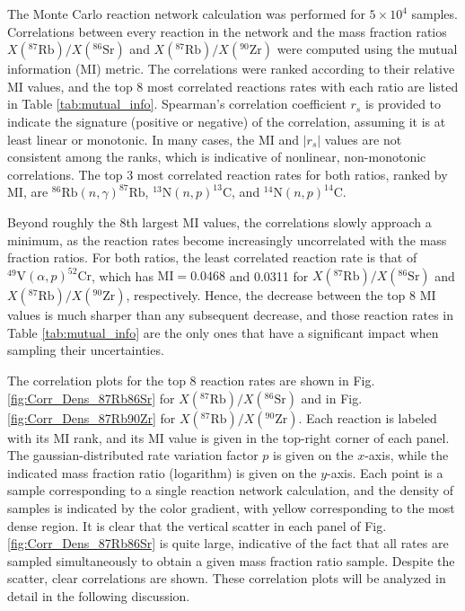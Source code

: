 The Monte Carlo reaction network calculation was performed for $5 \times 10^{4}$ samples. Correlations between every reaction in the network and the mass fraction ratios $X(^{87}\mathrm{Rb})/X(^{86}\mathrm{Sr})$ and $X(^{87}\mathrm{Rb})/X(^{90}\mathrm{Zr})$ were computed using the mutual information (MI) metric. The correlations were ranked according to their relative MI values, and the top 8 most correlated reactions rates with each ratio are listed in Table \ref{tab:mutual_info}. Spearman's correlation coefficient $r_{s}$ is provided to indicate the signature (positive or negative) of the correlation, assuming it is at least linear or monotonic. In many cases, the MI and $|r_{s}|$ values are not consistent among the ranks, which is indicative of nonlinear, non-monotonic correlations. The top 3 most correlated reaction rates for both ratios, ranked by MI, are $^{86}\mathrm{Rb}(n,\gamma)^{87}\mathrm{Rb}$, $^{13}\mathrm{N}(n,p)^{13}\mathrm{C}$, and $^{14}\mathrm{N}(n,p)^{14}\mathrm{C}$.%

Beyond roughly the 8th largest MI values, the correlations slowly approach a minimum, as the reaction rates become increasingly uncorrelated with the mass fraction ratios. For both ratios, the least correlated reaction rate is that of $^{49}\mathrm{V}(\alpha,p)^{52}\mathrm{Cr}$, which has $\mathrm{MI} = 0.0468$ and 0.0311 for $X(^{87}\mathrm{Rb})/X(^{86}\mathrm{Sr})$ and $X(^{87}\mathrm{Rb})/X(^{90}\mathrm{Zr})$, respectively. Hence, the decrease between the top 8 MI values is much sharper than any subsequent decrease, and those reaction rates in Table \ref{tab:mutual_info} are the only ones that have a significant impact when sampling their uncertainties.

The correlation plots for the top 8 reaction rates are shown in Fig. \ref{fig:Corr_Dens_87Rb86Sr} for $X(^{87}\mathrm{Rb})/X(^{86}\mathrm{Sr})$ and in Fig. \ref{fig:Corr_Dens_87Rb90Zr} for $X(^{87}\mathrm{Rb})/X(^{90}\mathrm{Zr})$. Each reaction is labeled with its MI rank, and its MI value is given in the top-right corner of each panel. The gaussian-distributed rate variation factor $p$ is given on the $x$-axis, while the indicated mass fraction ratio (logarithm) is given on the $y$-axis. Each point is a sample corresponding to a single reaction network calculation, and the density of samples is indicated by the color gradient, with yellow corresponding to the most dense region. It is clear that the vertical scatter in each panel of Fig. \ref{fig:Corr_Dens_87Rb86Sr} is quite large, indicative of the fact that all rates are sampled simultaneously to obtain a given mass fraction ratio sample. Despite the scatter, clear correlations are shown. These correlation plots will be analyzed in detail in the following discussion.

